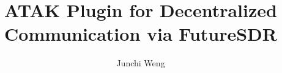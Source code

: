 \documentclass[sigconf]{acmart}
\begin{document}
\title{ATAK Plugin for Decentralized Communication via FutureSDR}


\author{Junchi Weng}

\renewcommand{\shortauthors}{J.Weng}

\begin{comment}
  \begin{abstract} %
    You may want to answer the following questions with roughly one sentence each.

    \begin{itemize}
    \item What is the topic of your main seminar paper?
    \item What problem does it solve?
    \item Why is that topic/problem important?
    \item What methodologies do the authors apply?
    \item What are the main contributions of the paper?
    \item What are the key findings/results of the paper?
    \end{itemize}
    
  \textbf{Hint 1:} You do not have to answer every question above. Consider only those that are relevant to your paper. 

  \end{abstract}
  ......
\end{comment}


\maketitle









\newpage

 
\end{document}
